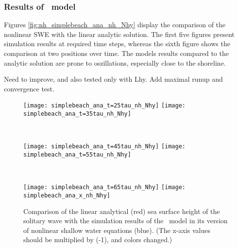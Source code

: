 \subsubsection{Results of \nh\ model}
Figures \eqref{fig:nh_simplebeach_ana_nh_Nhy} display the comparison of the nonlinear SWE with the linear analytic solution. The first five figures present simulation results at required time steps, whereas the sixth figure shows the comparison at two positions over time.
The models results compared to the analytic solution are prone to oszillations, especially close to the shoreline. 

Need to improve, and also tested only with Lhy.
Add maximal runup and convergence test.
\begin{figure}[htbp]
\begin{minipage}{\textwidth}
\texttt{[image: simplebeach\_ana\_t=25tau\_nh\_Nhy]}
\texttt{[image: simplebeach\_ana\_t=35tau\_nh\_Nhy]}
\end{minipage} \\
\begin{minipage}{\textwidth}
\texttt{[image: simplebeach\_ana\_t=45tau\_nh\_Nhy]}
\texttt{[image: simplebeach\_ana\_t=55tau\_nh\_Nhy]}
\end{minipage} \\
\begin{minipage}{\textwidth}
\texttt{[image: simplebeach\_ana\_t=65tau\_nh\_Nhy]}
\texttt{[image: simplebeach\_ana\_x\_nh\_Nhy]}
\end{minipage}
\caption{Comparison of the linear analytical (red) sea surface height of the
solitary wave with the simulation results of the \nh\ model in its version of nonlinear shallow water equations (blue). (The x-axis values should be multiplied by (-1), and colors changed.)}
\label{fig:nh_simplebeach_ana_nh_Nhy}
\end{figure}
